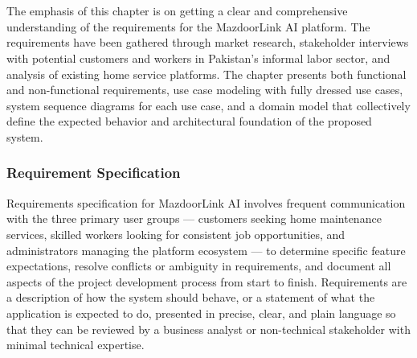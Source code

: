 \documentclass[12pt,a4paper]{report}
\begin{document}
\chapter[Requirement Specification and Analysis]{}

The emphasis of this chapter is on getting a clear and comprehensive
understanding of the requirements for the MazdoorLink AI platform. The
requirements have been gathered through market research, stakeholder interviews
with potential customers and workers in Pakistan's informal labor sector, and
analysis of existing home service platforms. The chapter presents both functional
and non-functional requirements, use case modeling with fully dressed use cases,
system sequence diagrams for each use case, and a domain model that collectively
define the expected behavior and architectural foundation of the proposed system.

\subsection*{Requirement Specification}

Requirements specification for MazdoorLink AI involves frequent communication
with the three primary user groups --- customers seeking home maintenance
services, skilled workers looking for consistent job opportunities, and
administrators managing the platform ecosystem --- to determine specific feature
expectations, resolve conflicts or ambiguity in requirements, and document all
aspects of the project development process from start to finish. Requirements are
a description of how the system should behave, or a statement of what the
application is expected to do, presented in precise, clear, and plain language
so that they can be reviewed by a business analyst or non-technical stakeholder
with minimal technical expertise.

\newpage
\end{document}
